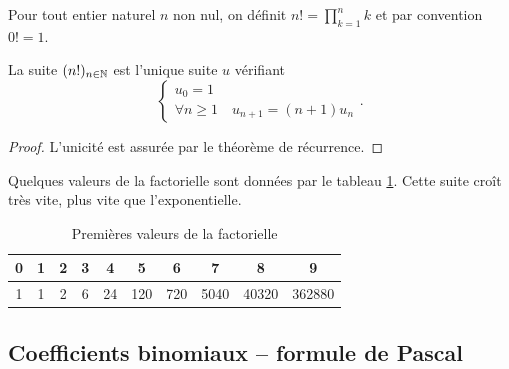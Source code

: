 \begin{defdef}
  Pour tout entier naturel \(n\) non nul, on définit \(n!=\prod_{k=1}^n k\) et par convention \(0!=1\).
\end{defdef}
\begin{prop}
  La suite \((n!)_{n\in\mathbb{N}}\) est l'unique suite \(u\) vérifiant
  \begin{equation}
    \begin{cases}
      u_0=1 \\
      \forall n\geqslant 1 \quad u_{n+1}=(n+1) u_n
    \end{cases}.
  \end{equation}
\end{prop}
\begin{proof}
  L'unicité est assurée par le théorème de récurrence. 
\end{proof}
Quelques valeurs de la factorielle sont données par le tableau \ref{tab:factorielle}. Cette suite croît très vite, plus vite que l'exponentielle.
\begin{table}[h]
    \centering
    \begin{tabular}{|c|c|c|c|c|c|c|c|c|c|}
        \hline
        0 & 1 & 2 & 3 & 4  & 5   & 6   & 7    & 8     & 9 \\ \hline
        1 & 1 & 2 & 6 & 24 & 120 & 720 & 5040 & 40320 & 362880 \\ \hline
    \end{tabular}
    \caption{Premières valeurs de la factorielle}
    \label{tab:factorielle}
\end{table}

\subsection{Coefficients binomiaux -- formule de Pascal}

